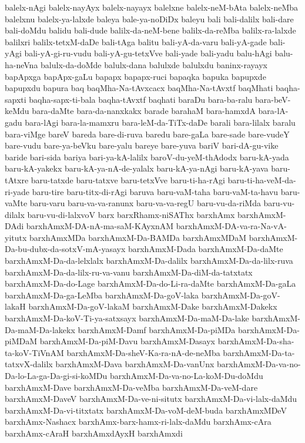 {balelx-nAgi
balelx-nayAyx
balelx-nayayx
balelxne
balelx-neM-bAta
balelx-neMba
balelxnu
balelx-ya-lalxde
baleya
bale-ya-noDiDx
baleyu
bali
bali-dalilx
bali-dare
bali-doMdu
balidu
bali-dude
balilx-da-neM-bene
balilx-da-reMba
balilx-ra-lalxde
balilxri
balilx-tetxM-daDe
bali-tAga
balitu
bali-yA-da-varu
bali-yA-gade
bali-yAgi
bali-yA-gi-ru-vudu
bali-yA-gu-tetxVve
bali-yade
bali-yadu
balu-hAgi
balu-ha-neVna
balulx-da-doMde
balulx-dana
balulxde
balulxdu
baninx-rayayx
bapApxga
bapApx-gaLu
bapapx
bapapx-ruci
bapaqka
bapuka
bapupxde
bapupxdu
bapura
baq
baqMha-Na-tAvxcacx
baqMha-Na-tAvxtf
baqMhati
baqha-sapxti
baqha-sapx-ti-bala
baqha-tAvxtf
baqhati
baraDu
bara-ba-ralu
bara-beV-keMdu
bara-daMte
bara-da-nanxkakx
barade
barahaM
bara-hamxdA
bara-lA-gadu
bara-lAgi
bara-la-mamxru
bara-leM-da-TiTx-daDe
barali
bara-lilalx
baralu
bara-viMge
bareV
bareda
bare-di-ruva
baredu
bare-gaLa
bare-sade
bare-vudeY
bare-vudu
bare-ya-beVku
bare-yalu
bareye
bare-yuva
bariV
bari-dA-gu-vike
baride
bari-sida
bariya
bari-ya-kA-lalilx
baroV-du-yeM-thAdodx
baru-kA-yada
baru-kA-yakekx
baru-kA-ya-nA-de-yalalx
baru-kA-ya-nAgi
baru-kA-yava
baru-tAtxre
baru-tatxde
baru-tatxve
baru-tetxVve
baru-ti-ha-rAgi
baru-ti-ha-veM-da-ri-yade
baru-tire
baru-titx-di-rAgi
baruva
baru-vaM-taha
baru-vaM-ta-havu
baru-vaMte
baru-varu
baru-va-va-ranunx
baru-va-va-regU
baru-vu-da-riMda
baru-vu-dilalx
baru-vu-di-lalxvoV
barx
barxRhamx-niSAThx
barxhAmx
barxhAmxM-DAdi
barxhAmxM-DA-nA-ma-saM-KAyxnAM
barxhAmxM-DA-va-ra-Na-vA-yitutx
barxhAmxMDa
barxhAmxM-Da-BAMDa
barxhAmxMDaM
barxhAmxM-Da-bu-dubx-da-sotxV-mA-yasayx
barxhAmxM-Dada
barxhAmxM-Da-daMte
barxhAmxM-Da-da-lelxlalx
barxhAmxM-Da-dalilx
barxhAmxM-Da-da-lilx-ruva
barxhAmxM-Da-da-lilx-ru-va-vanu
barxhAmxM-Da-diM-da-tatxtatx
barxhAmxM-Da-do-Lage
barxhAmxM-Da-do-Li-ra-daMte
barxhAmxM-Da-gaLa
barxhAmxM-Da-ga-LeMba
barxhAmxM-Da-goV-laka
barxhAmxM-Da-goV-lakaH
barxhAmxM-Da-goV-lakaM
barxhAmxM-Dake
barxhAmxM-Dakekx
barxhAmxM-Da-koV-Ti-ya-satxsayx
barxhAmxM-Da-maM-Da-lake
barxhAmxM-Da-maM-Da-lakekx
barxhAmxM-Damf
barxhAmxM-Da-piMDa
barxhAmxM-Da-piMDaM
barxhAmxM-Da-piM-Davu
barxhAmxM-Dasayx
barxhAmxM-Da-sha-ta-koV-TiVnAM
barxhAmxM-Da-sheV-Ka-ra-nA-de-neMba
barxhAmxM-Da-ta-tatxvX-dalilx
barxhAmxM-Dava
barxhAmxM-Da-vanUnx
barxhAmxM-Da-va-no-Da-lo-La-ga-Da-gi-si-koMDu
barxhAmxM-Da-va-no-La-koM-Du-doMdu
barxhAmxM-Dave
barxhAmxM-Da-veMba
barxhAmxM-Da-veM-dare
barxhAmxM-DaveV
barxhAmxM-Da-ve-ni-situtx
barxhAmxM-Da-vi-lalx-daMdu
barxhAmxM-Da-vi-titxtatx
barxhAmxM-Da-voM-deM-buda
barxhAmxMDeV
barxhAmx-Nashacx
barxhAmx-barx-hamx-ri-lalx-daMdu
barxhAmx-cAra
barxhAmx-cAraH
barxhAmxdAyxH
barxhAmxdi
}
